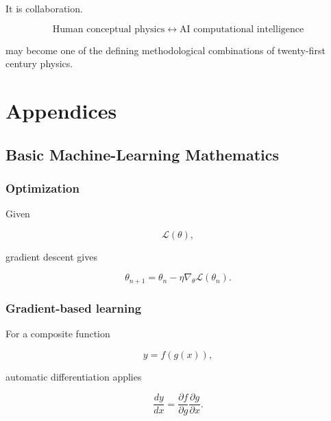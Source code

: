 \documentclass[11pt,a4paper,oneside]{book}
\newcommand{\Loss}{\mathcal{L}}
\begin{document}
It is collaboration.

\begin{equation}
\boxed{
\text{Human conceptual physics}
\;\longleftrightarrow\;
\text{AI computational intelligence}
}
\end{equation}

may become one of the defining methodological combinations of twenty-first
century physics.

\appendix

\part*{Appendices}

\chapter{Basic Machine-Learning Mathematics}

\section{Optimization}

Given

\begin{equation}
\Loss(\theta),
\end{equation}

gradient descent gives

\begin{equation}
\theta_{n+1}
=
\theta_n
-
\eta\nabla_\theta\Loss(\theta_n).
\end{equation}

\section{Gradient-based learning}

For a composite function

\begin{equation}
y=f(g(x)),
\end{equation}

automatic differentiation applies

\begin{equation}
\frac{dy}{dx}
=
\frac{\partial f}{\partial g}
\frac{\partial g}{\partial x}.
\end{equation}
\end{document}
